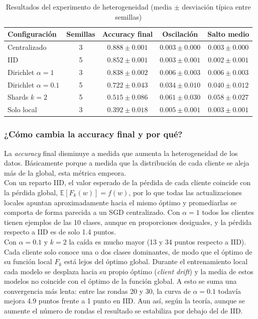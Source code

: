 \begin{table}[H]
    \centering
    \caption{Resultados del experimento de heterogeneidad (media $\pm$ desviación típica entre semillas)}
    \label{tab:q1}
    \setlength{\tabcolsep}{5pt}
    \begin{tabular}{lcccc}
        \hline
        Configuración & Semillas & Accuracy final & Oscilación & Salto medio \\
        \hline
        Centralizado & 3 & $0.888 \pm 0.001$ & $0.003 \pm 0.000$ & $0.003 \pm 0.000$ \\
        IID & 5 & $0.852 \pm 0.001$ & $0.003 \pm 0.001$ & $0.002 \pm 0.001$ \\
        Dirichlet $\alpha=1$ & 3 & $0.838 \pm 0.002$ & $0.006 \pm 0.003$ & $0.006 \pm 0.003$ \\
        Dirichlet $\alpha=0.1$ & 5 & $0.722 \pm 0.043$ & $0.034 \pm 0.010$ & $0.040 \pm 0.012$ \\
        Shards $k=2$ & 5 & $0.515 \pm 0.086$ & $0.061 \pm 0.030$ & $0.058 \pm 0.027$ \\
        Solo local & 3 & $0.392 \pm 0.018$ & $0.005 \pm 0.001$ & $0.003 \pm 0.001$ \\
        \hline
    \end{tabular}
\end{table}

\subsubsection{¿Cómo cambia la accuracy final y por qué?}
La \textit{accuracy} final disminuye a medida que aumenta la heterogeneidad de los datos. Básicamente 
porque a medida que la distribución de cada cliente se aleja más de la global, esta métrica empeora.
\\

Con un reparto IID, el valor esperado de la pérdida de cada cliente coincide con la pérdida global,
$\mathbb{E}[F_k(w)] = f(w)$, por lo que todas las actualizaciones locales apuntan aproximadamente hacia el mismo
óptimo y promediarlas se comporta de forma parecida a un SGD centralizado. Con $\alpha=1$ todos los clientes tienen
ejemplos de las 10 clases, aunque en proporciones desiguales, y la pérdida respecto a IID es de solo 1.4 puntos.
\\

Con $\alpha=0.1$ y $k=2$ la caída es mucho mayor (13 y 34 puntos respecto a IID). Cada cliente solo conoce una o
dos clases dominantes, de modo que el óptimo de su función local $F_k$ está lejos del óptimo global. Durante el
entrenamiento local cada modelo se desplaza hacia su propio óptimo (\textit{client drift}) y la media de estos
modelos no coincide con el óptimo de la función global. A esto se suma una convergencia más lenta: entre las
rondas 20 y 30, la curva de $\alpha=0.1$ todavía mejora 4.9 puntos frente a 1 punto en IID. Aun así, según la
teoría, aunque se aumente el número de rondas el resultado se estabiliza por debajo del de IID.
\\

